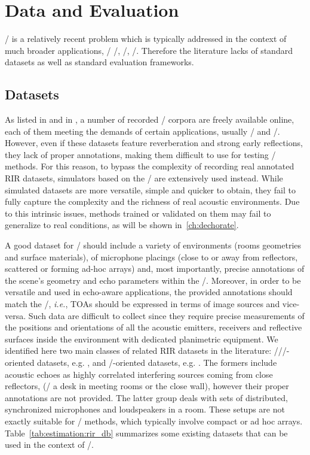 \section{Data and Evaluation}\label{sec:estimation:datametrics}
\AER/ is a relatively recent problem which is typically addressed in the context of much broader applications, \eg/ \SE/, \RooGE/, \SSL/.
Therefore the literature lacks of standard datasets as well as standard evaluation frameworks.

\subsection{Datasets}\label{sec:estimation:datasets}
As listed in  and in , a number of recorded \RIRs/ corpora are freely available online, each of them meeting the demands of certain applications, usually \SE/ and \ASR/.
However, even if these datasets feature reverberation and strong early reflections, they lack of proper annotations, making them difficult to use for testing \AER/ methods.
For this reason, to bypass the complexity of recording real annotated RIR datasets, simulators based on the \ISM/ are extensively used instead.
While simulated datasets are more versatile, simple and quicker to obtain, they fail to fully capture the complexity and the richness of real acoustic environments.
Due to this intrinsic issues, methods trained or validated on them may fail to generalize to real conditions, as will be shown in~\cref{ch:dechorate}.

\mynewline
A good dataset for \AER/ should include a variety of environments (rooms geometries and surface materials), of microphone placings (close to or away from reflectors, scattered or forming ad-hoc arrays) and, most importantly, precise annotations of the scene's geometry and echo parameters within the \RIRs/.
Moreover, in order to be versatile and used in echo-aware applications, the provided annotations should match the \ISM/, \textit{i.e.}, TOAs should be expressed in terms of image sources and vice-versa.
Such data are difficult to collect since they require precise measurements of the positions and orientations of all the acoustic emitters, receivers and reflective surfaces inside the environment with dedicated planimetric equipment.
We identified here two main classes of related RIR datasets in the literature:
\SE//\ASR/-oriented datasets, e.g. , and \RooGE/-oriented datasets, e.g. .
The formers include acoustic echoes as highly correlated interfering sources coming from close reflectors, (\eg/ a desk in meeting rooms or the close wall), however their proper annotations are not provided.
The latter group deals with sets of distributed, synchronized microphones and loudspeakers in a room.
These setups are not exactly suitable for \SE/ methods, which typically involve compact or ad hoc arrays.
Table~\ref{tab:estimation:rir_db} summarizes some existing datasets that can be used in the context of \AER/.

